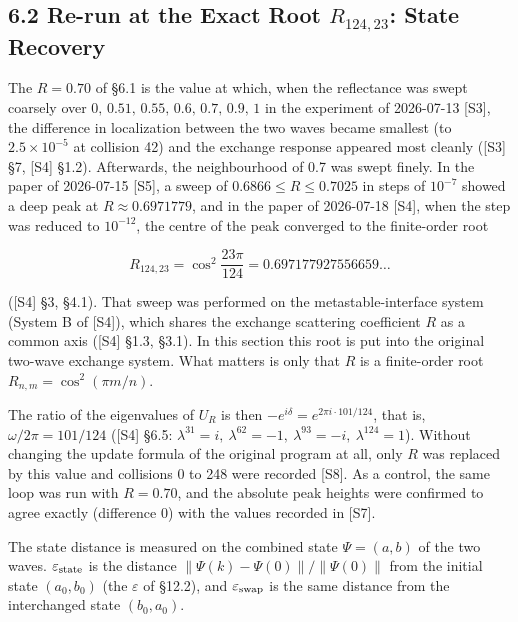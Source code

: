 \documentclass[
  a4paper,
]{article}
\begin{document}
\subsection{\texorpdfstring{6.2 Re-run at the Exact Root \(R_{124,23}\):
State
Recovery}{6.2 Re-run at the Exact Root R\_\{124,23\}: State Recovery}}\label{re-run-at-the-exact-root-r_12423-state-recovery}

The \(R=0.70\) of §6.1 is the value at which, when the reflectance was
swept coarsely over \(0,\,0.51,\,0.55,\,0.6,\,0.7,\,0.9,\,1\) in the
experiment of 2026-07-13 {[}S3{]}, the difference in localization
between the two waves became smallest (to \(2.5\times10^{-5}\) at
collision 42) and the exchange response appeared most cleanly ({[}S3{]}
§7, {[}S4{]} §1.2). Afterwards, the neighbourhood of 0.7 was swept
finely. In the paper of 2026-07-15 {[}S5{]}, a sweep of
\(0.6866\le R\le0.7025\) in steps of \(10^{-7}\) showed a deep peak at
\(R\approx0.6971779\), and in the paper of 2026-07-18 {[}S4{]}, when the
step was reduced to \(10^{-12}\), the centre of the peak converged to
the finite-order root

\[
R_{124,23}=\cos^2\frac{23\pi}{124}=0.697177927556659\ldots
\]

({[}S4{]} §3, §4.1). That sweep was performed on the
metastable-interface system (System B of {[}S4{]}), which shares the
exchange scattering coefficient \(R\) as a common axis ({[}S4{]} §1.3,
§3.1). In this section this root is put into the original two-wave
exchange system. What matters is only that \(R\) is a finite-order root
\(R_{n,m}=\cos^2(\pi m/n)\).

The ratio of the eigenvalues of \(U_R\) is then
\(-e^{i\delta}=e^{2\pi i\cdot101/124}\), that is,
\(\omega/2\pi=101/124\) ({[}S4{]} §6.5:
\(\lambda^{31}=i,\ \lambda^{62}=-1,\ \lambda^{93}=-i,\ \lambda^{124}=1\)).
Without changing the update formula of the original program at all, only
\(R\) was replaced by this value and collisions 0 to 248 were recorded
{[}S8{]}. As a control, the same loop was run with \(R=0.70\), and the
absolute peak heights were confirmed to agree exactly (difference 0)
with the values recorded in {[}S7{]}.

The state distance is measured on the combined state \(\Psi=(a,b)\) of
the two waves. \(\varepsilon_{\rm state}\) is the distance
\(\|\Psi(k)-\Psi(0)\|/\|\Psi(0)\|\) from the initial state \((a_0,b_0)\)
(the \(\varepsilon\) of §12.2), and \(\varepsilon_{\rm swap}\) is the
same distance from the interchanged state \((b_0,a_0)\).
\end{document}
